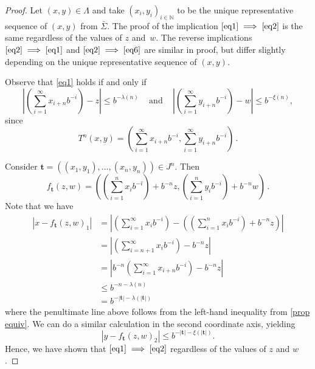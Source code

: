 \documentclass[12pt]{article}
\theoremstyle{remark}
\numberwithin{equation}{section}
\renewcommand{\Bbb}[1]{\mathbb{#1}}
\newcommand{\N}{{\Bbb N}}         %
\newcommand{\bt}{\mathbf{t}}
\newcommand{\0}{\mathbf{0}}
\begin{document}
\begin{proof}
Let $(x,y) \in \Lambda$ and take $(x_i,y_i)_{i \in \N}$ to be the unique representative sequence of $(x,y)$ from $\bar{\Sigma}$. The proof of the implication $\eqref{eq1} \implies \eqref{eq2}$ is the same regardless of the values of $z$ and~$w$. The reverse implications $\eqref{eq2} \implies \eqref{eq1}$ and $\eqref{eq2} \implies \eqref{eq6}$ are similar in proof, but {differ slightly} depending on the unique representative sequence of $(x,y)$.

 Observe that \eqref{eq1} holds if and only if
\begin{equation} \label{prop equiv}
\left| \left( \sum_{i=1}^{\infty}x_{i+n}b^{-i} \right) -z \right| \leq b^{-\lambda(n)} \, \quad \text{and} \quad \, \left| \left( \sum_{i=1}^{\infty}y_{i+n}b^{-i} \right) -w \right| \leq b^{-\xi(n)},
\end{equation}
since
\begin{equation*}
T^{n}(x,y)=\left( \sum_{i=1}^{\infty}x_{i+n}b^{-i}, \sum_{i=1}^{\infty}y_{i+n}b^{-i} \right)\, .
\end{equation*}

Consider $\bt=((x_{1},y_{1}), \dots , (x_{n},y_{n})) \in J^{n}$. Then
\begin{equation*}
f_{\bt}(z,w)=\left( \left(\sum_{i=1}^{n}x_{i}b^{-i}\right)+b^{-n}z, \left(\sum_{i=1}^{n}y_{i}b^{-i}\right)+b^{-n}w \right)\,.
\end{equation*}
Note that we have 
\begin{align*}
|x-f_{\bt}(z,w)_1| &= \left|\left(\sum_{i=1}^{\infty}{x_i b^{-i}}\right)-\left(\left(\sum_{i=1}^{n}{x_{i}b^{-i}}\right)+b^{-n}z\right)\right| \\
                   &= \left|\left(\sum_{i=n+1}^{\infty}{x_{i} b^{-i}}\right)-b^{-n}z\right| \\
                   &= \left|b^{-n}\left(\sum_{i=1}^{\infty}{x_{i+n} b^{-i}}\right)-b^{-n}z\right| \\
                   &\leq b^{-n-\lambda(n)} \\
                   &= b^{-|\bt|-\lambda(|\bt|)}
\end{align*}
where the penultimate line above follows from the left-hand inequality from \eqref{prop equiv}. We can do a similar calculation in the second coordinate axis, yielding
\[|y-f_{\bt}(z,w)_2| \leq b^{-|\bt|-\xi(|\bt|)}.\] 
Hence, we have shown that  $\eqref{eq1} \implies \eqref{eq2}$ regardless of the values of $z$ and $w$. 


\end{proof}
\end{document}
